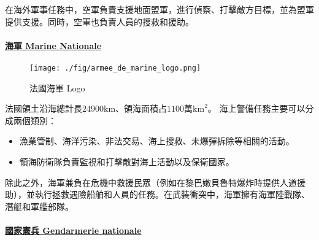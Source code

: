\documentclass[a4paper,14pt]{extarticle}
\theoremstyle{plain}
\theoremstyle{remark}
\numberwithin{equation}{section}
\begin{document}
在海外軍事任務中，空軍負責支援地面盟軍，進行偵察、打擊敵方目標，並為盟軍提供支援。同時，空軍也負責人員的搜救和援助。


\paragraph{\underline{海軍 Marine Nationale}}

\begin{wrapfigure}[7]{r}{5cm}
  \centering
  \texttt{[image: ./fig/armee\_de\_marine\_logo.png]}
  \caption{法國海軍 Logo}
\end{wrapfigure}



法國領土沿海總計長$24900\mathrm{km}$、領海面積占$1100$萬$\mathrm{km}^2$。
海上警備任務主要可以分成兩個類別：


\begin{itemize}
  \item 漁業管制、海洋污染、非法交易、海上搜救、未爆彈拆除等相關的活動。
  \item 領海防衛隊負責監視和打擊敵對海上活動以及保衛國家。
\end{itemize}

除此之外，海軍兼負在危機中救援民眾（例如在黎巴嫩貝魯特爆炸時提供人道援助），並執行拯救遇險船舶和人員的任務。在武裝衝突中，海軍擁有海軍陸戰隊、潛艇和軍艦部隊。

\paragraph{\underline{國家憲兵 Gendarmerie nationale}}


%
%
%
%
\end{document}
